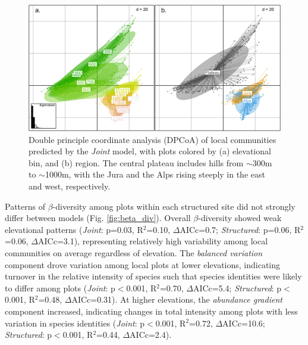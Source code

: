 \documentclass[preprint,review,times,12pt,3p]{elsarticle}
\begin{document}
\begin{figure}
	\centering\includegraphics[width=5in]{../../../ms/1_Ecography/1/figs/DPCoA_Joint.png}
	\caption{\label{fig:dpcoa_joint} Double principle coordinate analysis (DPCoA) of local communities predicted by the \emph{Joint} model, with plots colored by (a) elevational bin, and (b) region. The central plateau includes hills from $\sim$300m to $\sim$1000m, with the Jura and the Alps rising steeply in the east and west, respectively. }
\end{figure}

Patterns of $\beta$-diversity among plots within each structured site did not strongly differ between models (Fig. \ref{fig:beta_div}). Overall $\beta$-diversity showed weak elevational patterns (\emph{Joint}: p=0.03, R$^2$=0.10, $\Delta$AICc=0.7; \emph{Structured}: p=0.06, R$^2$=0.06, $\Delta$AICc=3.1), representing relatively high variability among local communities on average regardless of elevation. The \emph{balanced variation} component drove variation among local plots at lower elevations, indicating turnover in the relative intensity of species such that species identities were likely to differ among plots (\emph{Joint}: p$<$0.001, R$^2$=0.70, $\Delta$AICc=5.4; \emph{Structured}: p$<$0.001, R$^2$=0.48, $\Delta$AICc=0.31). At higher elevations, the \emph{abundance gradient} component increased, indicating changes in total intensity among plots with less variation in species identities (\emph{Joint}: p$<$0.001, R$^2$=0.72, $\Delta$AICc=10.6; \emph{Structured}: p$<$0.001, R$^2$=0.44, $\Delta$AICc=2.4). 
\end{document}
